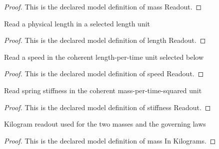\begin{proof}
  This is the declared model definition of mass Readout.
\end{proof}
\begin{definition}
  \label{def:physics:phyx-mini-0202:phyxminiproblems-problemphyxmini0202-lengthreadout}
  Read a physical length in a selected length unit
\end{definition}
\begin{proof}
  This is the declared model definition of length Readout.
\end{proof}
\begin{definition}
  \label{def:physics:phyx-mini-0202:phyxminiproblems-problemphyxmini0202-speedreadout}
  Read a speed in the coherent length-per-time unit selected below
\end{definition}
\begin{proof}
  This is the declared model definition of speed Readout.
\end{proof}
\begin{definition}
  \label{def:physics:phyx-mini-0202:phyxminiproblems-problemphyxmini0202-stiffnessreadout}
  Read spring stiffness in the coherent mass-per-time-squared unit
\end{definition}
\begin{proof}
  This is the declared model definition of stiffness Readout.
\end{proof}
\begin{definition}
  \label{def:physics:phyx-mini-0202:phyxminiproblems-problemphyxmini0202-massinkilograms}
  Kilogram readout used for the two masses and the governing laws
\end{definition}
\begin{proof}
  This is the declared model definition of mass In Kilograms.
\end{proof}
